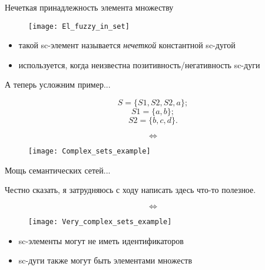 \documentclass[hyperref={pdftex,unicode}]{beamer}
\newcommand{\objeqv}{
  \begin{center}
    \begin{sideways}
      \[ \Longleftrightarrow \]
    \end{sideways}
  \end{center}
}
\begin{document}
\begin{frame}{Нечеткая принадлежность элемента множеству}
  \begin{figure}
    \centering
    \texttt{[image: El\_fuzzy\_in\_set]}
  \end{figure}

  \begin{itemize}
  \item такой sc-элемент называется \emph{нечеткой} константной sc-дугой
  \item используется, когда неизвестна позитивность/негативность sc-дуги
  \end{itemize}
\end{frame}

\begin{frame}{А теперь усложним пример...}
  \begin{center}
    \[ S = \{S1, S2, S2, a\}; \]
    \[ S1 = \{a, b\}; \]
    \[ S2 = \{b, c, d\}. \]
  \end{center}

  \objeqv

  \begin{figure}
    \texttt{[image: Complex\_sets\_example]}
  \end{figure}
\end{frame}

\begin{frame}{Мощь семантических сетей...}
  \begin{center}
    Честно сказать, я затрудняюсь с ходу написать здесь что-то
    полезное.
  \end{center}

  \objeqv  

  \begin{figure}
    \centering
    \texttt{[image: Very\_complex\_sets\_example]}
  \end{figure}

  \begin{itemize}
  \item sc-элементы могут не иметь идентификаторов
  \item sc-дуги также могут быть элементами множеств
  \end{itemize}
\end{frame}
\end{document}

